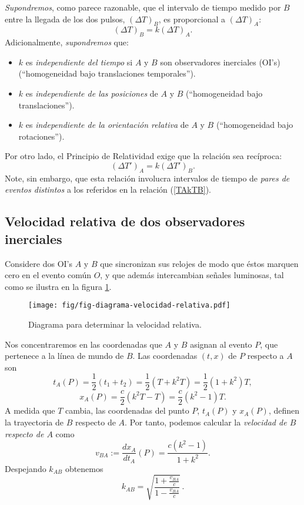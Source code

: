 \textit{Supondremos}, como parece razonable, que el intervalo de tiempo medido por $B$ entre la llegada
de los dos pulsos, $(\Delta T)_B$, es proporcional a $(\Delta T)_A$:
\begin{equation}
(\Delta T)_B=k (\Delta T)_A. \label{TAkTB}
\end{equation}
Adicionalmente, \textit{supondremos} que:
\begin{itemize}
\item $k$ es \textit{independiente del tiempo} si $A$ y $B$ son observadores inerciales (OI's) (``homogeneidad bajo
translaciones temporales'').
\item $k$ es \textit{independiente de las posiciones} de $A$ y $B$ (``homogeneidad bajo translaciones'').
\item $k$ es \textit{independiente de la orientación relativa} de $A$ y $B$ (``homogeneidad bajo rotaciones'').
\end{itemize}

Por otro lado, el Principio de Relatividad exige que la relación sea recíproca:
\begin{equation}
(\Delta T')_A=k (\Delta T')_B .\label{tkt}
\end{equation}
Note, sin embargo, que esta relación involucra intervalos de tiempo de \textit{pares de eventos distintos} a los referidos en la relación (\ref{TAkTB}).

\subsection{Velocidad relativa de dos observadores inerciales}

Considere dos OI's $A$ y $B$ que sincronizan sus relojes de
modo que éstos marquen cero en el evento común $O$, y que además intercambian señales luminosas, tal como se ilustra en la figura \ref{fig:k2}.
\begin{figure}[H]
\centerline{\texttt{[image: fig/fig-diagrama-velocidad-relativa.pdf]}}
 \caption{Diagrama para determinar la velocidad relativa.}
\label{fig:k2}
\end{figure}
Nos concentraremos en las coordenadas que $A$ y $B$ asignan al evento $P$, que  pertenece a la línea de mundo de $B$. Las coordenadas $(t,x)$ de $P$
respecto a $A$ son
\begin{equation}
t_A(P)=\frac{1}{2}(t_1+t_2)=\frac{1}{2}(T + k^2T)=\frac{1}{2}(1+k^2)T,
\end{equation}
\begin{equation}
x_A(P)=\frac{c}{2}(k^2T-T)=\frac{c}{2}(k^2-1)T.
\end{equation}
A medida que $T$ cambia, las coordenadas del punto $P$, $t_A(P)$ y $x_A(P)$, definen la trayectoria de $B$ respecto de $A$. Por tanto, podemos calcular la \textit{velocidad de $B$ respecto de $A$} como
\begin{equation}
v_{BA}:=\frac{dx_A}{dt_A}(P)=\frac{c(k^2-1)}{1+k^2}.
\end{equation}
Despejando $k_{AB}$ obtenemos
\begin{equation}
k_{AB}=\sqrt{\frac{1+\frac{v_{BA}}{c}}{1-\frac{v_{BA}}{c}}} \,.\label{k}
\end{equation}

